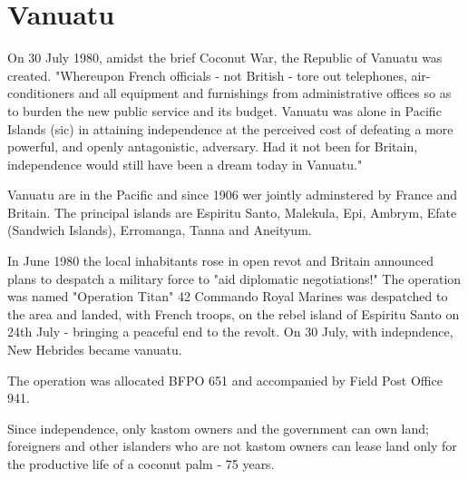 
\chapter{Vanuatu}  

On 30 July 1980, amidst the brief Coconut War, the Republic of Vanuatu was created.
"Whereupon French officials - not British - tore out telephones, air-conditioners and all equipment and furnishings from administrative offices so as to burden the new public service and its budget. Vanuatu was alone in Pacific Islands (sic) in attaining independence at the perceived cost of defeating a more powerful, and openly antagonistic, adversary. Had it not been for Britain, independence would still have been a dream today in Vanuatu."


Vanuatu are in the Pacific and since 1906 wer jointly adminstered by France and Britain. The principal islands are Espiritu Santo, Malekula, Epi, Ambrym, Efate (Sandwich Islands), Erromanga, Tanna and Aneityum.



In June 1980 the local inhabitants rose in open revot and Britain announced plans to despatch a military force to "aid diplomatic negotiations!" The operation was named "Operation Titan" 42 Commando Royal Marines was despatched to the area and landed, with French troops, on the rebel island of Espiritu Santo on 24th July - bringing  a peaceful end to the revolt. On 30 July, with indepndence, New Hebrides became vanuatu.

The operation was allocated BFPO 651 and accompanied by Field Post Office 941.

Since independence, only kastom owners and the government can own land; foreigners and other islanders who are not kastom owners can lease land only for the productive life of a coconut palm - 75 years. 

           